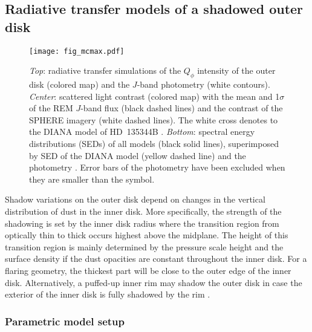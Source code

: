 \documentclass[twocolumn,tighten]{aastex61}
\begin{document}
\subsection{Radiative transfer models of a shadowed outer disk}\label{sec:radiative_transfer}

\begin{figure}
\centering
\texttt{[image: fig\_mcmax.pdf]}
\caption{\emph{Top}: radiative transfer simulations of the $Q_\phi$ intensity of the outer disk (colored map) and the $J$-band photometry (white contours). \emph{Center}: scattered light contrast (colored map) with the mean and 1$\sigma$ of the REM $J$-band flux (black dashed lines) and the contrast of the SPHERE imagery (white dashed lines). The white cross denotes to the DIANA model of HD~135344B \citep{woitke2016}. \emph{Bottom}: spectral energy distributions (SEDs) of all models (black solid lines), superimposed by SED of the DIANA model (yellow dashed line) and the photometry \citep[red points;][]{carmona2014}. Error bars of the photometry have been excluded when they are smaller than the symbol.\label{fig:mcmax}}
\end{figure}

Shadow variations on the outer disk depend on changes in the vertical distribution of dust in the inner disk. More specifically, the strength of the shadowing is set by the inner disk radius where the transition region from optically thin to thick occurs highest above the midplane. The height of this transition region is mainly determined by the pressure scale height and the surface density if the dust opacities are constant throughout the inner disk. For a flaring geometry, the thickest part will be close to the outer edge of the inner disk. Alternatively, a puffed-up inner rim may shadow the outer disk in case the exterior of the inner disk is fully shadowed by the rim \citep{dullemond2004,dong2015b}.

\subsubsection{Parametric model setup}\label{sec:model_setup}
\end{document}
